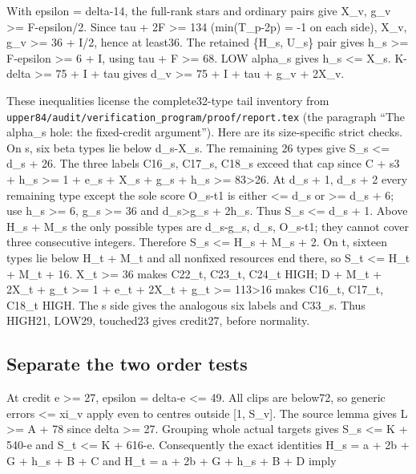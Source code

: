 \documentclass[11pt,a4paper]{article}
\begin{document}
With epsilon = delta-14, the full-rank stars and ordinary pairs give
X\_v, g\_v \textgreater= F-epsilon/2. Since tau + 2F \textgreater= 134
(min(T\_p-2p) = -1 on each side), X\_v, g\_v \textgreater= 36 + I/2,
hence at least36. The retained \{H\_s, U\_s\} pair gives h\_s
\textgreater= F-epsilon \textgreater= 6 + I, using tau + F \textgreater=
68. LOW alpha\_s gives h\_s \textless= X\_s. K-delta \textgreater= 75 +
I + tau gives d\_v \textgreater= 75 + I + tau + g\_v + 2X\_v.

These inequalities license the complete32-type tail inventory from
\texttt{upper84/audit/verification\_program/proof/report.tex} (the
paragraph ``The alpha\_s hole: the fixed-credit argument''). Here are
its size-specific strict checks. On s, six beta types lie below
d\_s-X\_s. The remaining 26 types give S\_s \textless= d\_s + 26. The
three labels C16\_s, C17\_s, C18\_s exceed that cap since C + s3 + h\_s
\textgreater= 1 + e\_s + X\_s + g\_s + h\_s \textgreater=
83\textgreater26. At d\_s + 1, d\_s + 2 every remaining type except the
sole score O\_s-t1 is either \textless= d\_s or \textgreater= d\_s + 6;
use h\_s \textgreater= 6, g\_s \textgreater= 36 and
d\_s\textgreater g\_s + 2h\_s. Thus S\_s \textless= d\_s + 1. Above H\_s
+ M\_s the only possible types are d\_s-g\_s, d\_s, O\_s-t1; they cannot
cover three consecutive integers. Therefore S\_s \textless= H\_s + M\_s
+ 2. On t, sixteen types lie below H\_t + M\_t and all nonfixed
resources end there, so S\_t \textless= H\_t + M\_t + 16. X\_t
\textgreater= 36 makes C22\_t, C23\_t, C24\_t HIGH; D + M\_t + 2X\_t +
g\_t \textgreater= 1 + e\_t + 2X\_t + g\_t \textgreater=
113\textgreater16 makes C16\_t, C17\_t, C18\_t HIGH. The s side gives
the analogous six labels and C33\_s. Thus HIGH21, LOW29, touched23 gives
credit27, before normality.

\hypertarget{separate-the-two-order-tests}{%
\subsection{Separate the two order
tests}\label{separate-the-two-order-tests}}

At credit e \textgreater= 27, epsilon = delta-e \textless= 49. All clips
are below72, so generic errors \textless= xi\_v apply even to centres
outside {[}1, S\_v{]}. The source lemma gives L \textgreater= A + 78
since delta \textgreater= 27. Grouping whole actual targets gives S\_s
\textless= K + 540-e and S\_t \textless= K + 616-e. Consequently the
exact identities H\_s = a + 2b + G + h\_s + B + C and H\_t = a + 2b + G
+ h\_s + B + D imply
\end{document}
